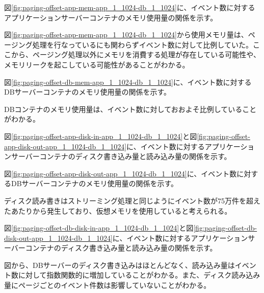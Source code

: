 \documentclass[../../../../main]{subfiles}
\begin{document}
    図\ref{fig:paging-offset-app-mem-app_1_1024-db_1_1024}に、イベント数に対するアプリケーションサーバーコンテナのメモリ使用量の関係を示す。

    

    図\ref{fig:paging-offset-app-mem-app_1_1024-db_1_1024}から使用メモリ量は、ページング処理を行なっているにも関わらずイベント数に対して比例していた。ここから、ページング処理以外にメモリを消費する処理が存在している可能性や、メモリリークを起こしている可能性があることがわかる。

    図\ref{fig:paging-offset-db-mem-app_1_1024-db_1_1024}に、イベント数に対するDBサーバーコンテナのメモリ使用量の関係を示す。

    

    DBコンテナのメモリ使用量は、イベント数に対しておおよそ比例していることがわかる。

    \label{subsubsubsec:result-paging-offset-only-limit-disk-io}

    図\ref{fig:paging-offset-app-disk-in-app_1_1024-db_1_1024}と図\ref{fig:paging-offset-app-disk-out-app_1_1024-db_1_1024}に、イベント数に対するアプリケーションサーバーコンテナのディスク書き込み量と読み込み量の関係を示す。

    

    図\ref{fig:paging-offset-app-disk-out-app_1_1024-db_1_1024}に、イベント数に対するDBサーバーコンテナのメモリ使用量の関係を示す。

    

    ディスク読み書きはストリーミング処理と同じようにイベント数が75万件を超えたあたりから発生しており、仮想メモリを使用していると考えられる。

    図\ref{fig:paging-offset-db-disk-in-app_1_1024-db_1_1024}と図\ref{fig:paging-offset-db-disk-out-app_1_1024-db_1_1024}に、イベント数に対するアプリケーションサーバーコンテナのディスク書き込み量と読み込み量の関係を示す。

    

    

    図から、DBサーバーのディスク書き込みはほとんどなく、読み込み量はイベント数に対して指数関数的に増加していることがわかる。また、ディスク読み込み量にページごとのイベント件数は影響していないことがわかる。
\end{document}
